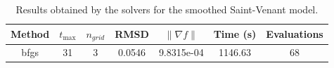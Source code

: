 \begin{table}[htbp]
\centering
\caption{Results obtained by the solvers for the smoothed Saint-Venant model.}
\label{tab:methods_new_SV}
\begin{tabular}{c|c|ccccc}
\hline
Method & $t_{\max}$ & $n_{grid}$ & RMSD & $\|\nabla f\|$ & Time (s) & Evaluations \\ \hline
bfgs & \multirow{1}{*}{31} & 3 & 0.0546 & 9.8315e-04 & 1146.63 & 68 \\
\hline
\end{tabular}
\end{table}
